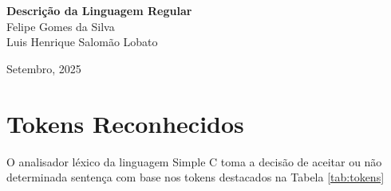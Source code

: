 \documentclass[12pt,a4paper]{article}
\begin{document}
\begin{titlepage}
	\begin{center}
	
	\vspace{115pt}
 \textbf{\Huge{Descrição da Linguagem Regular}}\\
  
	\vspace{115pt}
 Felipe Gomes da Silva \\
 Luis Henrique Salomão Lobato \\
	\end{center}
	
	\vspace{1cm}
	\begin{center}
		\vspace{\fill}
 \large{Setembro, 2025} 
	\end{center}
\end{titlepage}


\section{Tokens Reconhecidos}
\label{sec:token}

O analisador léxico da linguagem Simple C toma a decisão de aceitar ou não determinada sentença com base nos tokens destacados na Tabela \ref{tab:tokens}
\end{document}
